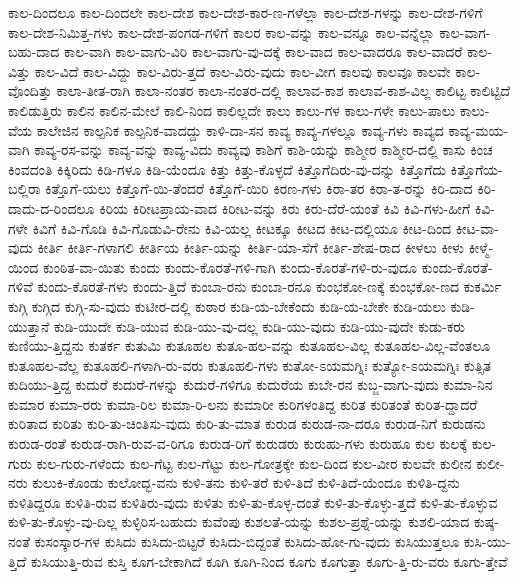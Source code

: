 {ಕಾಲ-ದಿಂದಲೂ
ಕಾಲ-ದಿಂದಲೇ
ಕಾಲ-ದೇಶ
ಕಾಲ-ದೇಶ-ಕಾರ-ಣ-ಗಳೆಲ್ಲಾ
ಕಾಲ-ದೇಶ-ಗಳನ್ನು
ಕಾಲ-ದೇಶ-ಗಳಿಗೆ
ಕಾಲ-ದೇಶ-ನಿಮಿತ್ತ-ಗಳು
ಕಾಲ-ದೇಶ-ಪಂಗಡ-ಗಳಿಗೆ
ಕಾಲರ
ಕಾಲ-ವನ್ನು
ಕಾಲ-ವನ್ನೂ
ಕಾಲ-ವನ್ನೆಲ್ಲಾ
ಕಾಲ-ವಾಗ-ಬಹು-ದಾದ
ಕಾಲ-ವಾಗಿ
ಕಾಲ-ವಾಗು-ವಿರಿ
ಕಾಲ-ವಾಗು-ವು-ದಕ್ಕೆ
ಕಾಲ-ವಾದ
ಕಾಲ-ವಾದರೂ
ಕಾಲ-ವಾದರೆ
ಕಾಲ-ವಿತ್ತು
ಕಾಲ-ವಿದೆ
ಕಾಲ-ವಿದ್ದು
ಕಾಲ-ವಿರು-ತ್ತದೆ
ಕಾಲ-ವಿರು-ವುದು
ಕಾಲ-ವೀಗ
ಕಾಲವು
ಕಾಲವೂ
ಕಾಲವೇ
ಕಾಲ-ವೊಂದಿತ್ತು
ಕಾಲಾ-ತೀತ-ರಾಗಿ
ಕಾಲಾ-ನಂತರ
ಕಾಲಾ-ನಂತರ-ದಲ್ಲಿ
ಕಾಲಾವ-ಕಾಶ
ಕಾಲಾವ-ಕಾಶ-ವಿಲ್ಲ
ಕಾಲಿಟ್ಟ
ಕಾಲಿಟ್ಟಿದೆ
ಕಾಲಿಡುತ್ತಿರು
ಕಾಲಿನ
ಕಾಲಿನ-ಮೇಲೆ
ಕಾಲಿ-ನಿಂದ
ಕಾಲಿಲ್ಲದೇ
ಕಾಲು
ಕಾಲು-ಗಳ
ಕಾಲು-ಗಳೇ
ಕಾಲು-ಪಾಲು
ಕಾಲು-ವೆಯ
ಕಾಲೇಜಿನ
ಕಾಲ್ಪನಿಕ
ಕಾಲ್ಪನಿಕ-ವಾದದ್ದು
ಕಾಳಿ-ದಾ-ಸನ
ಕಾವ್ಯ
ಕಾವ್ಯ-ಗಳಲ್ಲೂ
ಕಾವ್ಯ-ಗಳು
ಕಾವ್ಯದ
ಕಾವ್ಯ-ಮಯ-ವಾಗಿ
ಕಾವ್ಯ-ರಸ-ವನ್ನು
ಕಾವ್ಯ-ವನ್ನು
ಕಾವ್ಯ-ವಿದು
ಕಾವ್ಯವು
ಕಾಶಿಗೆ
ಕಾಶಿ-ಯನ್ನು
ಕಾಶ್ಮೀರ
ಕಾಶ್ಮೀರ-ದಲ್ಲಿ
ಕಾಸು
ಕಿಂಚ
ಕಿಂವದಂತಿ
ಕಿಕ್ಕಿರಿದು
ಕಿಡಿ-ಗಳೂ
ಕಿಡಿ-ಯೆಂದೂ
ಕಿತ್ತು
ಕಿತ್ತು-ಕೊಳ್ಳದೆ
ಕಿತ್ತೊಗೆದಿರು-ವು-ದನ್ನು
ಕಿತ್ತೊಗೆದು
ಕಿತ್ತೊಗೆಯ-ಬಲ್ಲಿರಾ
ಕಿತ್ತೊಗೆ-ಯಲು
ಕಿತ್ತೊಗೆ-ಯಿ-ತೆಂದರೆ
ಕಿತ್ತೊಗೆ-ಯಿರಿ
ಕಿರಣ-ಗಳು
ಕಿರಾ-ತರ
ಕಿರಾ-ತ-ರನ್ನು
ಕಿರಿ-ದಾದ
ಕಿರಿ-ದಾದು-ದ-ರಿಂದಲೂ
ಕಿರಿಯ
ಕಿರೀಟಪ್ರಾಯ-ವಾದ
ಕಿರೀಟ-ವನ್ನು
ಕಿರು
ಕಿರು-ದೆರೆ-ಯಂತೆ
ಕಿವಿ
ಕಿವಿ-ಗಳು-ಹೀಗೆ
ಕಿವಿ-ಗಳೇ
ಕಿವಿಗೆ
ಕಿವಿ-ಗೊಡಿ
ಕಿವಿ-ಗೊಡುವಿ-ರೇನು
ಕಿವಿ-ಯಲ್ಲ
ಕೀಟಕ್ಕೂ
ಕೀಟದ
ಕೀಟ-ದಲ್ಲಿಯೂ
ಕೀಟ-ದಿಂದ
ಕೀಟ-ವಾ-ವುದು
ಕೀರ್ತಿ
ಕೀರ್ತಿ-ಗಳಾಗಲಿ
ಕೀರ್ತಿಯ
ಕೀರ್ತಿ-ಯನ್ನು
ಕೀರ್ತಿ-ಯಾ-ಸೆಗೆ
ಕೀರ್ತಿ-ಶೇಷ-ರಾದ
ಕೀಳಲು
ಕೀಳು
ಕೀಳ್ಮೆ-ಯಿಂದ
ಕುಂಠಿತ-ವಾ-ಯಿತು
ಕುಂದು
ಕುಂದು-ಕೊರತೆ-ಗಳಿ-ಗಾಗಿ
ಕುಂದು-ಕೊರತೆ-ಗಳಿ-ರು-ವುದೂ
ಕುಂದು-ಕೊರತೆ-ಗಳಿವೆ
ಕುಂದು-ಕೊರತೆ-ಗಳು
ಕುಂದು-ತ್ತಿದೆ
ಕುಂಬಾ-ರನು
ಕುಂಬಾ-ರನೂ
ಕುಂಭಕೋ-ಣಕ್ಕೆ
ಕುಂಭಕೋ-ಣದ
ಕುಕರ್ಮಿ
ಕುಗ್ಗಿ
ಕುಗ್ಗಿದ
ಕುಗ್ಗಿ-ಸು-ವುದು
ಕುಟೀರ-ದಲ್ಲಿ
ಕುಠಾರ
ಕುಡಿ-ಯ-ಬೇಕೆಂದು
ಕುಡಿ-ಯ-ಬೇಕೇ
ಕುಡಿ-ಯಲು
ಕುಡಿ-ಯುತ್ತಾನೆ
ಕುಡಿ-ಯುದೇ
ಕುಡಿ-ಯುವ
ಕುಡಿ-ಯು-ವು-ದಲ್ಲ
ಕುಡಿ-ಯು-ವುದು
ಕುಡಿ-ಯು-ವುದೇ
ಕುಡು-ಕರು
ಕುಣಿಯು-ತ್ತಿದ್ದನು
ಕುತರ್ಕ
ಕುತುಮಿ
ಕುತೂಹಲ
ಕುತೂ-ಹಲ-ವನ್ನು
ಕುತೂಹಲ-ವಿಲ್ಲ
ಕುತೂಹಲ-ವಿಲ್ಲ-ವೆಂತಲೂ
ಕುತೂಹಲ-ವೆಲ್ಲ
ಕುತೂಹಲಿ-ಗಳಾಗಿ-ರು-ವರು
ಕುತೂಹಲಿ-ಗಳು
ಕುತೋ-ಽಯಮಗ್ನಿಃ
ಕುತ್ಯೋ-ಽಯಮಗ್ನಿಃ
ಕುತ್ಸಿತ
ಕುದಿಯು-ತ್ತಿದ್ದ
ಕುದುರೆ
ಕುದುರೆ-ಗಳನ್ನು
ಕುದುರೆ-ಗಳಿಗೂ
ಕುದುರೆಯ
ಕುಬೇ-ರನ
ಕುಬ್ಜ-ವಾಗು-ವುದು
ಕುಮಾ-ನಿನ
ಕುಮಾರ
ಕುಮಾ-ರರು
ಕುಮಾ-ರಿಲ
ಕುಮಾ-ರಿ-ಲನು
ಕುಮಾರೀ
ಕುರಿಗಳಂತಿದ್ದ
ಕುರಿತ
ಕುರಿತಂತೆ
ಕುರಿತ-ದ್ದಾದರೆ
ಕುರಿತಾದ
ಕುರಿತು
ಕುರಿ-ತು-ಚಿಂತಿಸು-ವುದು
ಕುರಿ-ತು-ಮಾತ
ಕುರುಡ
ಕುರುಡ-ನಾ-ದರೂ
ಕುರುಡ-ನಿಗೆ
ಕುರುಡನು
ಕುರುಡ-ರಂತೆ
ಕುರುಡ-ರಾಗಿ-ರುವ-ವ-ರಿಗೂ
ಕುರುಡ-ರಿಗೆ
ಕುರುಡರು
ಕುರುಹು-ಗಳು
ಕುರುಹೂ
ಕುಲ
ಕುಲಕ್ಕೆ
ಕುಲ-ಗುರು
ಕುಲ-ಗುರು-ಗಳೆಂದು
ಕುಲ-ಗೆಟ್ಟ
ಕುಲ-ಗೆಟ್ಟು
ಕುಲ-ಗೋತ್ರಕ್ಕೇ
ಕುಲ-ದಿಂದ
ಕುಲ-ವೀರ
ಕುಲವೇ
ಕುಲೀನ
ಕುಲೀ-ನರು
ಕುಲುಕಿ-ಕೊಂಡು
ಕುಲೋದ್ಭ-ವನು
ಕುಳಿ-ತನು
ಕುಳಿ-ತರೆ
ಕುಳಿ-ತಿದೆ
ಕುಳಿ-ತಿದೆ-ಯೆಂದೂ
ಕುಳಿತಿ-ದ್ದನು
ಕುಳಿತಿದ್ದರೂ
ಕುಳಿತಿ-ರುವ
ಕುಳಿತಿರು-ವುದು
ಕುಳಿತು
ಕುಳಿ-ತು-ಕೊಳ್ಳ-ದಂತೆ
ಕುಳಿ-ತು-ಕೊಳ್ಳು-ತ್ತದೆ
ಕುಳಿ-ತು-ಕೊಳ್ಳುವ
ಕುಳಿ-ತು-ಕೊಳ್ಳು-ವು-ದಿಲ್ಲ
ಕುಳ್ಳಿರಿಸ-ಬಹುದು
ಕುವೆಂಪು
ಕುಶಲತೆ-ಯನ್ನು
ಕುಶಲ-ಪ್ರಶ್ನೆ-ಯನ್ನು
ಕುಶಲಿ-ಯಾದ
ಕುಷ್ಠ-ನಂತೆ
ಕುಸಂಸ್ಕಾರ-ಗಳ
ಕುಸಿದು
ಕುಸಿದು-ಬಿಟ್ಟರೆ
ಕುಸಿದು-ಬಿದ್ದಂತೆ
ಕುಸಿದು-ಹೋ-ಗು-ವುದು
ಕುಸಿಯುತ್ತಲೂ
ಕುಸಿ-ಯು-ತ್ತಿದೆ
ಕುಸಿಯುತ್ತಿ-ರುವ
ಕುಸ್ತಿ
ಕೂಗ-ಬೇಕಾಗಿದೆ
ಕೂಗಿ
ಕೂಗಿ-ನಿಂದ
ಕೂಗು
ಕೂಗುತ್ತಾ
ಕೂಗು-ತ್ತಿ-ರು-ವರು
ಕೂಗು-ತ್ತೇವೆ
}
